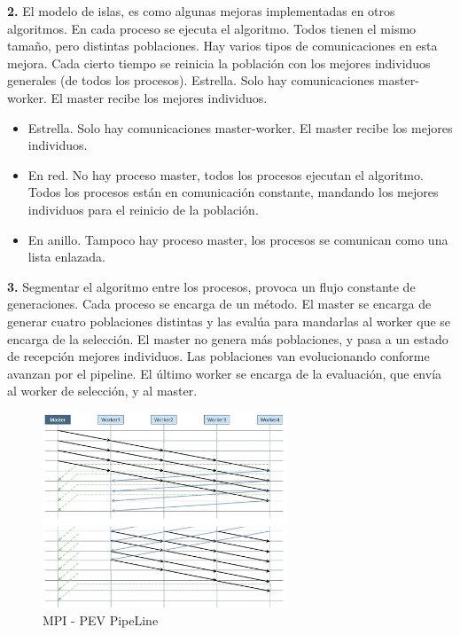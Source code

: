 	\textbf{2.} El modelo de islas, es como algunas mejoras implementadas en otros algoritmos. En cada proceso se ejecuta el algoritmo. Todos tienen el mismo tamaño, pero distintas poblaciones. Hay varios tipos de comunicaciones en esta mejora. Cada cierto tiempo se reinicia la población con los mejores individuos generales (de todos los procesos).
	Estrella. Solo hay comunicaciones master-worker. El master recibe los mejores individuos.
	\begin{itemize}
		\item Estrella. Solo hay comunicaciones master-worker. El master recibe los mejores individuos.
		\item En red. No hay proceso master, todos los procesos ejecutan el algoritmo. Todos los procesos están en comunicación constante, mandando los mejores individuos para el reinicio de la población.
		\item En anillo. Tampoco hay proceso master, los procesos se comunican como una lista enlazada.
	\end{itemize}
	
	\textbf{3.} Segmentar el algoritmo entre los procesos, provoca un flujo constante de generaciones. Cada proceso se encarga de un método. 
	El master se encarga de generar cuatro poblaciones distintas y las evalúa para mandarlas al worker que se encarga de la selección. El master no genera más poblaciones, y pasa a un estado de recepción mejores individuos. Las poblaciones van evolucionando conforme avanzan por el pipeline. El último worker se encarga de la evaluación, que envía al worker de selección, y al master.
	
	\begin{figure}[!h]
		\centering
		\includegraphics[width=0.65\textwidth]{images/chapter_3/pev_mpi3}
		\caption{MPI - PEV PipeLine}
		\label{fig:pevpipe}
	\end{figure}

